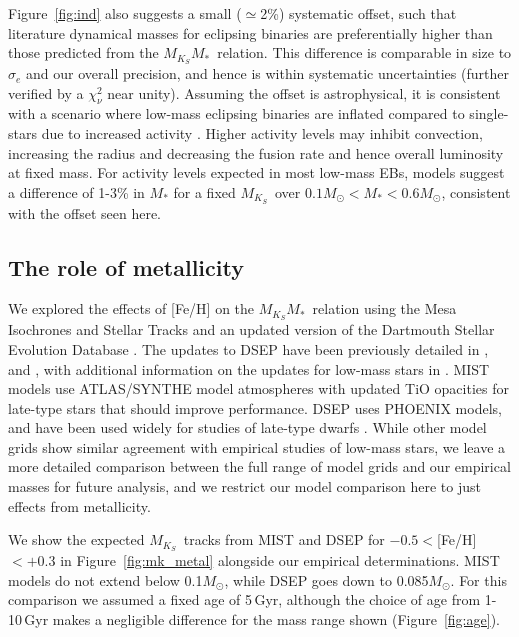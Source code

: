 \documentclass[twocolumn]{aastex62}
\newcommand{\mks}{$M_{K_S}$}
\newcommand{\mmk}{$M_{K_S}$\textendash$M_*$}
\begin{document}
Figure~\ref{fig:ind} also suggests a small ($\simeq$2\%) systematic offset, such that literature dynamical masses for eclipsing binaries are preferentially higher than those predicted from the \mmk\ relation. This difference is comparable in size to $\sigma_e$ and our overall precision, and hence is within systematic uncertainties (further verified by a $\chi^2_\nu$ near unity). Assuming the offset is astrophysical, it is consistent with a scenario where low-mass eclipsing binaries are inflated compared to single-stars due to increased activity \citep[e.g.,][]{MacDonald2012, Feiden2013,Feiden2014a,Somers2017}. Higher activity levels may inhibit convection, increasing the radius and decreasing the fusion rate and hence overall luminosity at fixed mass. For activity levels expected in most low-mass EBs, \citet{Feiden2016} models suggest a difference of 1-3\% in $M_*$ for a fixed \mks\ over $0.1M_\odot<M_*<0.6M_\odot$, consistent with the offset seen here. 

\subsection{The role of metallicity}\label{sec:metal}

We explored the effects of [Fe/H] on the \mmk\ relation using the Mesa Isochrones and Stellar Tracks \citep[MIST,][]{MIST0,MIST1} and an updated version of the Dartmouth Stellar Evolution Database \citep[DSEP,][]{Dotter2008}. The updates to DSEP have been previously detailed in \citet{Feiden2013,Feiden2014a}, and \citet{Muirhead2014}, with additional information on the updates for low-mass stars in \citet{Mann2015b}. MIST models use ATLAS/SYNTHE model atmospheres \citep{2004astro.ph..5087C} with updated TiO opacities for late-type stars that should improve performance. DSEP uses PHOENIX \cite{Hauschildt1999,1999ApJ...525..871H} models, and have been used widely for studies of late-type dwarfs \citep[e.g.,][]{Boyajian2012,Bell2015,Kesseli2018}. While other model grids \citep[e.g.,YaPSI, PARSEC, Lyon][]{Spada2013,Chen2014,BHAC15} show similar agreement with empirical studies of low-mass stars, we leave a more detailed comparison between the full range of model grids and our empirical masses for future analysis, and we restrict our model comparison here to just effects from metallicity. 

We show the expected \mks\ tracks from MIST and DSEP for $-0.5<$[Fe/H]$<+0.3$ in Figure~\ref{fig:mk_metal} alongside our empirical determinations. MIST models do not extend below 0.1$M_\odot$, while DSEP goes down to 0.085$M_\odot$. For this comparison we assumed a fixed age of 5\,Gyr, although the choice of age from 1-10\,Gyr makes a negligible difference for the mass range shown (Figure~\ref{fig:age}). 
\end{document}
